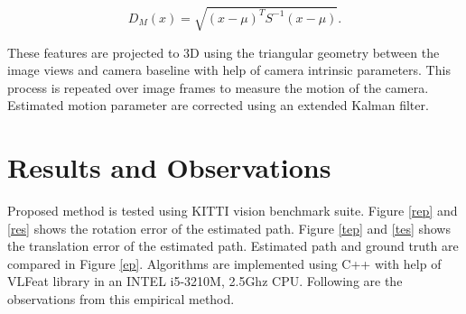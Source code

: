 \documentclass{article}
\begin{document}
\begin{equation}D_M(x) = \sqrt{(x - \mu)^T S^{-1} (x-\mu)}.\end{equation}

These features are projected to 3D using the triangular geometry between the image views and camera baseline with help of camera intrinsic parameters. This process is repeated over image frames to measure the motion of the camera. Estimated motion parameter are corrected using an extended Kalman filter.

\section{Results and Observations}
Proposed method is tested using KITTI vision benchmark suite\cite{Geiger2012CVPR}. Figure \ref{rep} and \ref{res} shows the rotation error of the estimated path. Figure \ref{tep} and \ref{tes} shows the translation error of the estimated path. Estimated path and ground truth are compared in Figure \ref{ep}. Algorithms are implemented using C++ with help of VLFeat  library in an  INTEL i5-3210M, 2.5Ghz CPU. Following are the observations from this empirical method.
\end{document}
